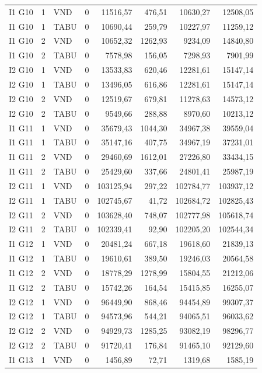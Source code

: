 \begin{longtable}{lrlrrrrr}
I1 G10 & 1 & VND & 0 & 11516,57 & 476,51 & 10630,27 & 12508,05 \\
I1 G10 & 1 & TABU & 0 & 10690,44 & 259,79 & 10227,97 & 11259,12 \\
I1 G10 & 2 & VND & 0 & 10652,32 & 1262,93 & 9234,09 & 14840,80 \\
I1 G10 & 2 & TABU & 0 & 7578,98 & 156,05 & 7298,93 & 7901,99 \\
I2 G10 & 1 & VND & 0 & 13533,83 & 620,46 & 12281,61 & 15147,14 \\
I2 G10 & 1 & TABU & 0 & 13496,05 & 616,86 & 12281,61 & 15147,14 \\
I2 G10 & 2 & VND & 0 & 12519,67 & 679,81 & 11278,63 & 14573,12 \\
I2 G10 & 2 & TABU & 0 & 9549,66 & 288,88 & 8970,60 & 10213,12 \\
I1 G11 & 1 & VND & 0 & 35679,43 & 1044,30 & 34967,38 & 39559,04 \\
I1 G11 & 1 & TABU & 0 & 35147,16 & 407,75 & 34967,19 & 37231,01 \\
I1 G11 & 2 & VND & 0 & 29460,69 & 1612,01 & 27226,80 & 33434,15 \\
I1 G11 & 2 & TABU & 0 & 25429,60 & 337,66 & 24801,41 & 25987,19 \\
I2 G11 & 1 & VND & 0 & 103125,94 & 297,22 & 102784,77 & 103937,12 \\
I2 G11 & 1 & TABU & 0 & 102745,67 & 41,72 & 102684,72 & 102825,43 \\
I2 G11 & 2 & VND & 0 & 103628,40 & 748,07 & 102777,98 & 105618,74 \\
I2 G11 & 2 & TABU & 0 & 102339,41 & 92,90 & 102205,20 & 102544,34 \\
I1 G12 & 1 & VND & 0 & 20481,24 & 667,18 & 19618,60 & 21839,13 \\
I1 G12 & 1 & TABU & 0 & 19610,61 & 389,50 & 19246,03 & 20564,58 \\
I1 G12 & 2 & VND & 0 & 18778,29 & 1278,99 & 15804,55 & 21212,06 \\
I1 G12 & 2 & TABU & 0 & 15742,26 & 164,54 & 15415,85 & 16255,07 \\
I2 G12 & 1 & VND & 0 & 96449,90 & 868,46 & 94454,89 & 99307,37 \\
I2 G12 & 1 & TABU & 0 & 94573,96 & 544,21 & 94065,51 & 96033,62 \\
I2 G12 & 2 & VND & 0 & 94929,73 & 1285,25 & 93082,19 & 98296,77 \\
I2 G12 & 2 & TABU & 0 & 91720,41 & 176,84 & 91465,10 & 92129,60 \\
I1 G13 & 1 & VND & 0 & 1456,89 & 72,71 & 1319,68 & 1585,19 \\

\end{longtable}
